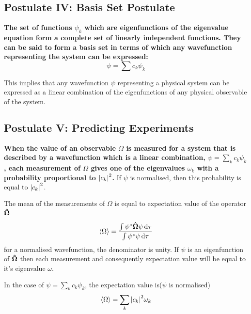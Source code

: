 \documentclass[11pt]{article}
\theoremstyle{definition}
\begin{document}
\subsection{Postulate IV: Basis Set Postulate}

\textbf{The set of functions $\psi_k$ which are eigenfunctions of the eigenvalue equation form a complete set of linearly independent functions. They can be said to form a basis set in terms of which any wavefunction representing the system can be expressed:}
\begin{equation*}
    \psi = \sum c_k \psi_k
\end{equation*}

This implies that any wavefunction $\psi$ representing a physical system can be expressed as a linear combination of the eigenfunctions of any physical observable of the system.



\subsection{Postulate V: Predicting Experiments}
\textbf{When the value of an observable $\Omega$ is measured for a system that is described by a wavefunction which is a linear combination, $\psi = \sum_k c_k \psi_k$, each measurement of $\Omega$ gives one of the eigenvalues $\omega_k$ with a probability proportional to $\abs{c_k}^2$.}
If $\psi$ is normalised, then this probability is equal to $\abs{c_k}^2$.


\begin{shaded}
The mean of the measurements of $\Omega$ is equal to expectation value of the operator $\vectorunit{\Omega}$

\begin{equation*}
    \expval{\Omega} = \frac{\int \psi^* \vectorunit{\Omega} \psi \dd{\tau}}{\int \psi^* \psi \dd{\tau}}
\end{equation*}
for a normalised wavefunction, the denominator is unity. If $\psi$ is an eigenfunction of $\vectorunit{\Omega}$ then each measurement and consequently expectation value will be equal to it's eigenvalue $\omega$.

In the case of $\psi = \sum_{k} c_k \psi_k$, the expectation value is($\psi$ is normalised)
\begin{equation*}
    \expval{\Omega} = \sum_{k} \abs{c_k}^2 \omega_k
\end{equation*}

\end{shaded}
\end{document}
